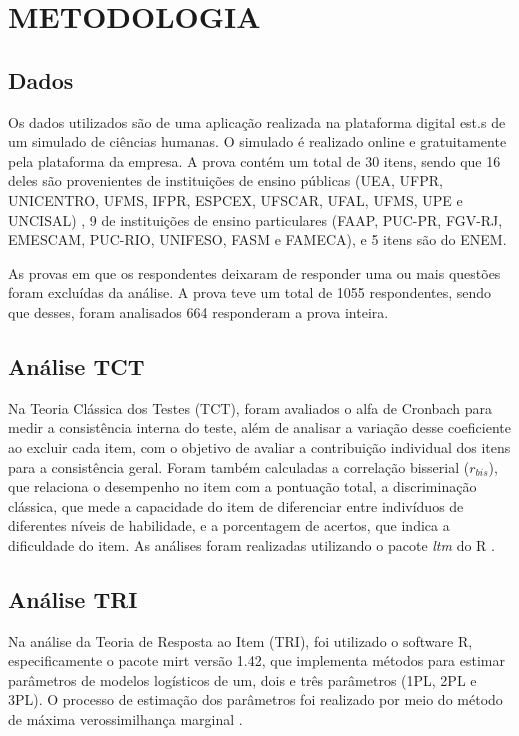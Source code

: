 \chapter{METODOLOGIA}

\section{Dados}

Os dados utilizados são  de uma aplicação realizada na plataforma digital est.s de um simulado de ciências humanas. O simulado é realizado online e gratuitamente pela plataforma da empresa. 
A prova contém um total de 30 itens, sendo que 16 deles são provenientes de instituições de ensino públicas (UEA, UFPR, UNICENTRO, UFMS, IFPR, ESPCEX, UFSCAR, UFAL, UFMS, UPE e UNCISAL) , 9 de instituições de ensino particulares (FAAP, PUC-PR, FGV-RJ, EMESCAM, PUC-RIO, UNIFESO, FASM e FAMECA), e 5 itens são do ENEM.


As provas em que os respondentes deixaram de responder uma ou mais questões foram excluídas da análise. A prova teve um total de 1055 respondentes, sendo que desses, foram analisados 664 responderam a prova inteira.



\section{Análise TCT}

Na Teoria Clássica dos Testes (TCT), foram avaliados o alfa de Cronbach para medir a consistência interna do teste, além de analisar a variação desse coeficiente ao excluir cada item, com o objetivo de avaliar a contribuição individual dos itens para a consistência geral. Foram também calculadas a correlação bisserial ($r_{bis}$), que relaciona o desempenho no item com a pontuação total, a discriminação clássica, que mede a capacidade do item de diferenciar entre indivíduos de diferentes níveis de habilidade, e a porcentagem de acertos, que indica a dificuldade do item. As análises foram realizadas utilizando o pacote \textit{ltm} \cite{ltm} do R \cite{r}.

\section{Análise TRI}

Na análise da Teoria de Resposta ao Item (TRI), foi utilizado o software R, especificamente o pacote mirt \cite{mirt} versão 1.42, que implementa métodos para estimar parâmetros de modelos logísticos de um, dois e três parâmetros (1PL, 2PL e 3PL). O processo de estimação dos parâmetros foi realizado por meio do método de máxima verossimilhança marginal \cite{mirt2024}.

